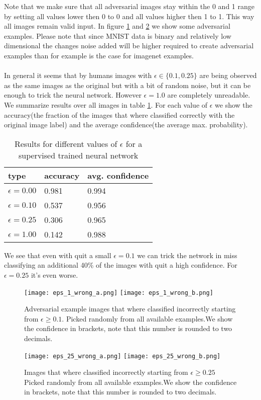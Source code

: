 \documentclass[a4paper]{article}
\begin{document}
\noindent Note that we make sure that all adversarial images stay within the 0 and 1 range by setting all values lower then 0 to 0 and all values higher then 1 to 1. This way all images remain valid input. In figure \ref{fig:adv_image_1} and \ref{fig:adv_image_2} we show some adversarial examples. Please note that since MNIST data is binary and relatively low dimensional the changes noise added will be higher required to create adversarial examples than for example is the case for imagenet examples. \\ \\
\noindent In general it seems that by humans images with $\epsilon \in \{0.1, 0.25\}$ are being observed as the same images as the original but with a bit of random noise, but it can be enough to trick the neural network. However $\epsilon = 1.0$ are completely unreadable. 
\noindent We summarize  results over all images in table \ref{table:adv1}. For each value of $\epsilon$ we show the  accuracy(the fraction of the images that where classified correctly with the original image label) and the average confidence(the average max. probability).  
\begin{table}[H]
\centering
\begin{tabular}{|l|l|l|}\hline
\textbf{type} & \textbf{accuracy} & \textbf{avg. confidence}\\\hline
$\epsilon = 0.00$ & 0.981 & 0.994\\\hline
$\epsilon = 0.10$ & 0.537 & 0.956\\\hline
$\epsilon = 0.25$ & 0.306 & 0.965\\\hline
$\epsilon = 1.00$ & 0.142 & 0.988\\\hline
\end{tabular}
\caption{Results for different values of $\epsilon$ for a supervised trained neural network }
\label{table:adv1}
\end{table}
\noindent We see that even with quit a small $\epsilon=0.1$ we can trick the network in miss classifying an additional 40\% of the images with quit a high confidence. For $\epsilon=0.25$ it's even worse. 

\newpage
\begin{figure}[H]
\texttt{[image: eps\_1\_wrong\_a.png]}
\texttt{[image: eps\_1\_wrong\_b.png]}
\caption{Adversarial example images that where classified incorrectly starting from $\epsilon \geq 0.1$. Picked randomly from all available examples.We show the confidence in brackets, note that this number is rounded to two decimals. }\label{fig:adv_image_1}
\end{figure}
\begin{figure}[H]
\texttt{[image: eps\_25\_wrong\_a.png]}
\texttt{[image: eps\_25\_wrong\_b.png]}
\caption{Images that where classified incorrectly starting from $\epsilon \geq 0.25$ Picked randomly from all available examples.We show the confidence in brackets, note that this number is rounded to two decimals.}\label{fig:adv_image_2}
\end{figure}
\newpage
\end{document}

